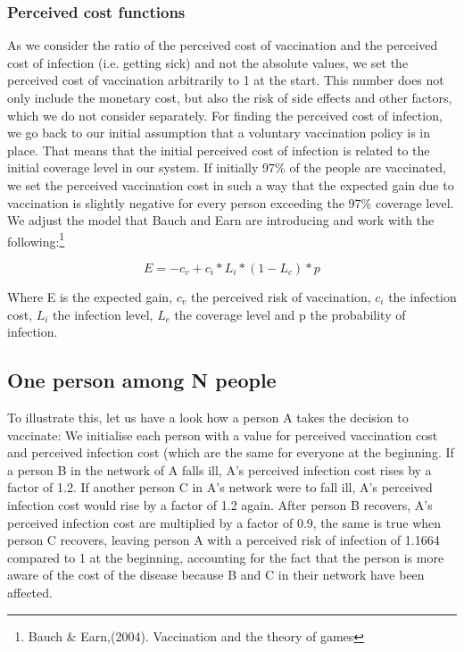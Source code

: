 \documentclass[11pt]{article}
\begin{document}
\subsubsection{Perceived cost functions} 
As we consider the ratio of the perceived cost of vaccination and the perceived cost of infection (i.e. getting sick) and not the absolute values, we set the perceived cost of vaccination arbitrarily to 1 at the start. This number does not only include the monetary cost, but also the risk of side effects and other factors, which we do not consider separately. For finding the perceived cost of infection, we go back to our initial assumption that a voluntary vaccination policy is in place. That means that the initial perceived cost of infection is related to the initial coverage level in our system. If initially 97\% of the people are vaccinated, we set the perceived vaccination cost in such a way that the expected gain due to vaccination is slightly negative for every person exceeding the 97\% coverage level. We adjust the model that Bauch and Earn are introducing and work with the following:\footnote{Bauch \& Earn,(2004). Vaccination and the theory of games} 

\begin{equation}
E = -c_v + c_i*L_i*(1-L_c)*p
\end{equation}

Where E is the expected gain, $c_v$ the perceived risk of vaccination, $c_i$ the infection cost, $L_i$ the infection level, $L_c$ the coverage level and p the probability of infection. 
\vspace{14px}
 

\subsection{One person among N people}
To illustrate this, let us have a look how a person A takes the decision to vaccinate: 
We initialise each person with a value for perceived vaccination cost and perceived infection cost (which are the same for everyone at the beginning. 
If a person B in the network of A falls ill, A's perceived infection cost rises by a factor of 1.2. If another person C in A's network were to fall ill, A's perceived infection cost would rise by a factor of 1.2 again. After person B recovers, A's perceived infection cost are multiplied by a factor of 0.9, the same is true when person C recovers, leaving person A with a perceived risk of infection of 1.1664 compared to 1 at the beginning, accounting for the fact that the person is more aware of the cost of the disease because B and C in their network have been affected. 
\end{document}
